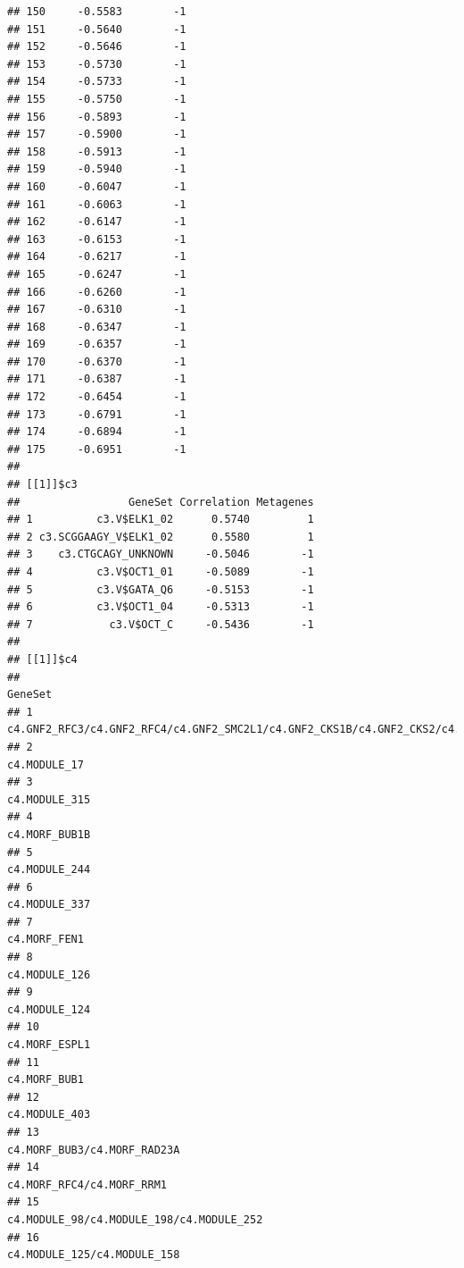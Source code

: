 \documentclass{article}\usepackage[]{graphicx}\usepackage[]{color}
\makeatletter
\newenvironment{kframe}{%
 \def\at@end@of@kframe{}%
 \ifinner\ifhmode%
  \def\at@end@of@kframe{\end{minipage}}%
  \begin{minipage}{\columnwidth}%
 \fi\fi%
 \def\FrameCommand##1{\hskip\@totalleftmargin \hskip-\fboxsep
 \colorbox{shadecolor}{##1}\hskip-\fboxsep
     \hskip-\linewidth \hskip-\@totalleftmargin \hskip\columnwidth}%
 \MakeFramed {\advance\hsize-\width
   \@totalleftmargin\z@ \linewidth\hsize
   \@setminipage}}%
 {\par\unskip\endMakeFramed%
 \at@end@of@kframe}
\newenvironment{knitrout}{}{} %
\makeatother
\begin{document}
\begin{knitrout}
\begin{kframe}
\begin{verbatim}
## 150     -0.5583        -1
## 151     -0.5640        -1
## 152     -0.5646        -1
## 153     -0.5730        -1
## 154     -0.5733        -1
## 155     -0.5750        -1
## 156     -0.5893        -1
## 157     -0.5900        -1
## 158     -0.5913        -1
## 159     -0.5940        -1
## 160     -0.6047        -1
## 161     -0.6063        -1
## 162     -0.6147        -1
## 163     -0.6153        -1
## 164     -0.6217        -1
## 165     -0.6247        -1
## 166     -0.6260        -1
## 167     -0.6310        -1
## 168     -0.6347        -1
## 169     -0.6357        -1
## 170     -0.6370        -1
## 171     -0.6387        -1
## 172     -0.6454        -1
## 173     -0.6791        -1
## 174     -0.6894        -1
## 175     -0.6951        -1
## 
## [[1]]$c3
##                 GeneSet Correlation Metagenes
## 1          c3.V$ELK1_02      0.5740         1
## 2 c3.SCGGAAGY_V$ELK1_02      0.5580         1
## 3    c3.CTGCAGY_UNKNOWN     -0.5046        -1
## 4          c3.V$OCT1_01     -0.5089        -1
## 5          c3.V$GATA_Q6     -0.5153        -1
## 6          c3.V$OCT1_04     -0.5313        -1
## 7            c3.V$OCT_C     -0.5436        -1
## 
## [[1]]$c4
##                                                                            GeneSet
## 1  c4.GNF2_RFC3/c4.GNF2_RFC4/c4.GNF2_SMC2L1/c4.GNF2_CKS1B/c4.GNF2_CKS2/c4.GNF2_TTK
## 2                                                                     c4.MODULE_17
## 3                                                                    c4.MODULE_315
## 4                                                                    c4.MORF_BUB1B
## 5                                                                    c4.MODULE_244
## 6                                                                    c4.MODULE_337
## 7                                                                     c4.MORF_FEN1
## 8                                                                    c4.MODULE_126
## 9                                                                    c4.MODULE_124
## 10                                                                   c4.MORF_ESPL1
## 11                                                                    c4.MORF_BUB1
## 12                                                                   c4.MODULE_403
## 13                                                     c4.MORF_BUB3/c4.MORF_RAD23A
## 14                                                       c4.MORF_RFC4/c4.MORF_RRM1
## 15                                        c4.MODULE_98/c4.MODULE_198/c4.MODULE_252
## 16                                                     c4.MODULE_125/c4.MODULE_158

\end{verbatim}
\end{kframe}
\end{knitrout}
\end{document}
